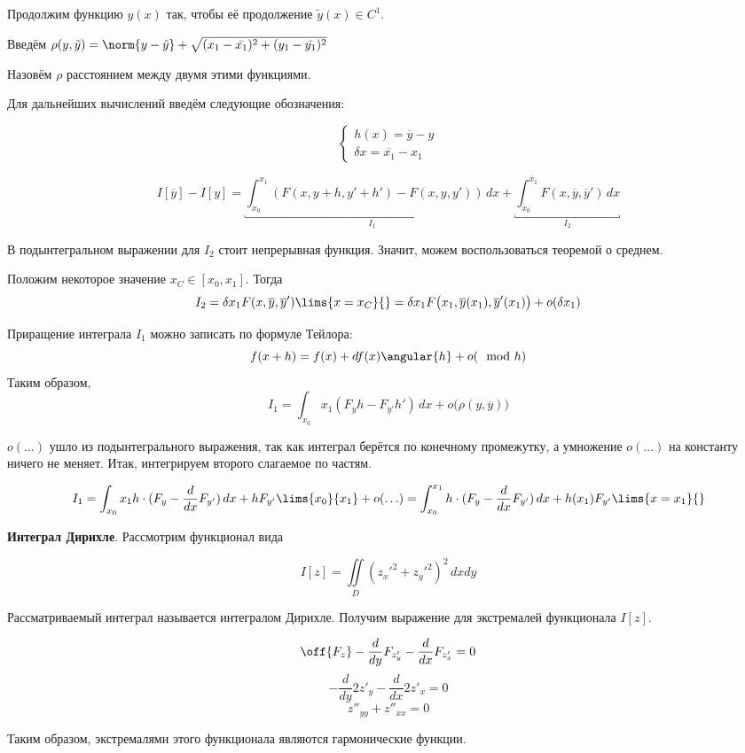 	Продолжим функцию $y(x)$ так, чтобы её продолжение
	$\tilde{y}(x) \in C^1$.
	
	Введём $\rho(y, \tilde{y}) = 
	\norm{y - \tilde{y}} + \sqrt{(x_1 - \bar{x_1})^2 + (y_1 - \bar{y_1})^2}$
	
	Назовём $\rho$ расстоянием между двумя этими функциями.
	
	Для дальнейших вычислений введём следующие обозначения:
	
	$$
		\left\{
		\begin{aligned}
			h(x) = \overline{y} - y \\
			\delta x = \overline{x_1} - x_1
		\end{aligned}
		\right.
	$$
	
	$$I[\overline{y}] - I[y] = 
	  \underbracket{\int_{x_0}^{x_1} (F(x, y + h, y' + h') - F(x, y, y')) \,dx}_{I_1} +
	  \underbracket{\int_{\overline{x}_0}^{\overline{x}_1} F(x, \overline{y}, \overline{y}') \,dx}_{I_2}$$
	  
	В подынтегральном выражении для $I_2$ стоит непрерывная функция. Значит, можем воспользоваться теоремой о среднем.
	
	
	Положим некоторое значение $x_C \in [x_0, x_1]$. Тогда 
	$$I_2 = \delta x_1 F(x, \overline{y}, \overline{y}')\lims{x = x_C}{} 
	= \delta x_1 F\big(x_1, \overline{y}(x_1), \overline{y}'(x_1)\big) + o(\delta x_1)$$
	
	Приращение интеграла $I_1$ можно записать по формуле Тейлора:
	$$f(x + h) = f(x) + df(x) \angular{h} + o(\mod{h})$$
	Таким образом, 
	$$I_1 = \int_{x_0}{x_1} (F_yh - F_{y'}h') \,dx + o\big(\rho(y, \overline{y})\big)$$
	
	$o(\ldots)$ ушло из подынтегрального выражения, так как интеграл берётся по конечному промежутку, а 
	умножение $o(\ldots)$ на константу ничего не меняет. Итак, интегрируем второго слагаемое по частям.
	
	$$I_1 = \int_{x_0}{x_1} h\cdot(F_y - \frac{d}{dx}F_{y'}) \,dx + hF_{y'}\lims{x_0}{x_1} + o(\ldots) = 
	  \int_{x_0}^{x_1} h\cdot(F_y - \frac{d}{dx}F_{y'}) \,dx + h(x_1) F_{y'}\lims{x = x_1}{}$$
	  
	
	\textbf{Интеграл Дирихле}. Рассмотрим функционал вида 
	
	$$I[z] = \iint\limits_D (z_x'^2 + z_y'^2)^2 \,dxdy$$
	
	Рассматриваемый интеграл называется интегралом Дирихле. Получим выражение 
	для экстремалей функционала $I[z]$.
	
	$$\off{F_z} - \frac{d}{dy} F_{z'_y} - \frac{d}{dx} F_{z'_x} = 0$$
	$$-\frac{d}{dy} 2z'_y - \frac{d}{dx} 2z'_x = 0$$
	$$z''_{yy} + z''_{xx} = 0$$
	
	Таким образом, экстремалями этого функционала являются гармонические функции.